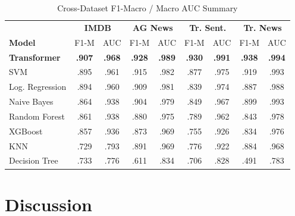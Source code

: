 \documentclass[conference]{IEEEtran}
\begin{document}
\begin{table}[htbp]
	\caption{Cross-Dataset F1-Macro / Macro AUC Summary}
	\label{tab:cross_results}
	\begin{center}
		\footnotesize
		\renewcommand{\arraystretch}{1.2}
		\setlength{\tabcolsep}{4pt}
		\begin{tabular}{lcccccccc}
			\toprule
			\rowcolor{headerblue}
			& \multicolumn{2}{c}{\color{white}\textbf{IMDB}}
			& \multicolumn{2}{c}{\color{white}\textbf{AG News}}
			& \multicolumn{2}{c}{\color{white}\textbf{Tr. Sent.}}
			& \multicolumn{2}{c}{\color{white}\textbf{Tr. News}} \\
			\rowcolor{headerblue}
			\color{white}\textbf{Model}
			& \color{white}F1-M & \color{white}AUC
			& \color{white}F1-M & \color{white}AUC
			& \color{white}F1-M & \color{white}AUC
			& \color{white}F1-M & \color{white}AUC \\
			\midrule
			\textbf{Transformer} & \textbf{.907} & \textbf{.968} & \textbf{.928} & \textbf{.989} & \textbf{.930} & \textbf{.991} & \textbf{.938} & \textbf{.994} \\
			SVM             & .895 & .961 & .915 & .982 & .877 & .975 & .919 & .993 \\
			Log. Regression & .894 & .960 & .909 & .981 & .839 & .974 & .887 & .988 \\
			Naive Bayes     & .864 & .938 & .904 & .979 & .849 & .967 & .899 & .993 \\
			Random Forest   & .861 & .938 & .880 & .975 & .789 & .962 & .843 & .978 \\
			XGBoost         & .857 & .936 & .873 & .969 & .755 & .926 & .834 & .976 \\
			KNN             & .729 & .793 & .891 & .969 & .776 & .922 & .884 & .968 \\
			Decision Tree   & .733 & .776 & .611 & .834 & .706 & .828 & .491 & .783 \\
			\bottomrule
		\end{tabular}
	\end{center}
\end{table}

\section{Discussion}
\label{sec:discussion}
\end{document}
